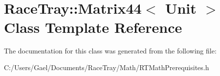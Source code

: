 \hypertarget{class_race_tray_1_1_matrix44}{\section{Race\-Tray\-:\-:Matrix44$<$ Unit $>$ Class Template Reference}
\label{class_race_tray_1_1_matrix44}
}


The documentation for this class was generated from the following file\-:\begin{DoxyCompactItemize}
\item 
C\-:/\-Users/\-Gael/\-Documents/\-Race\-Tray/\-Math/R\-T\-Math\-Prerequisites.\-h\end{DoxyCompactItemize}
